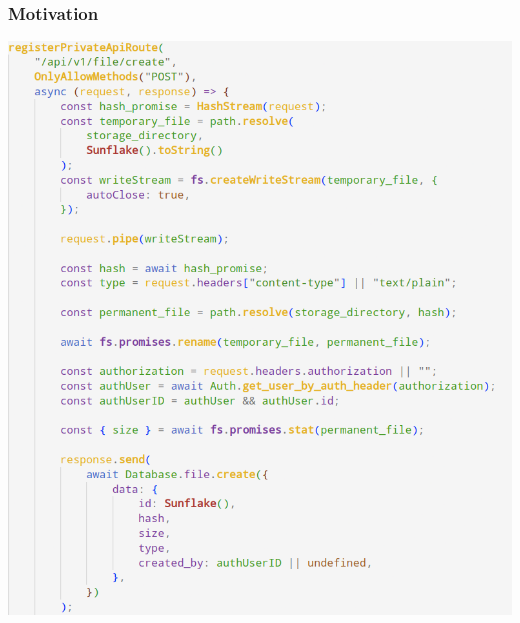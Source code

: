 \begin{frame}
  \frametitle{Motivation}
  \begin{center}
    \includegraphics[width=\textwidth]{img/01-scary-screenshot-2.png}
  \end{center}
\end{frame}

